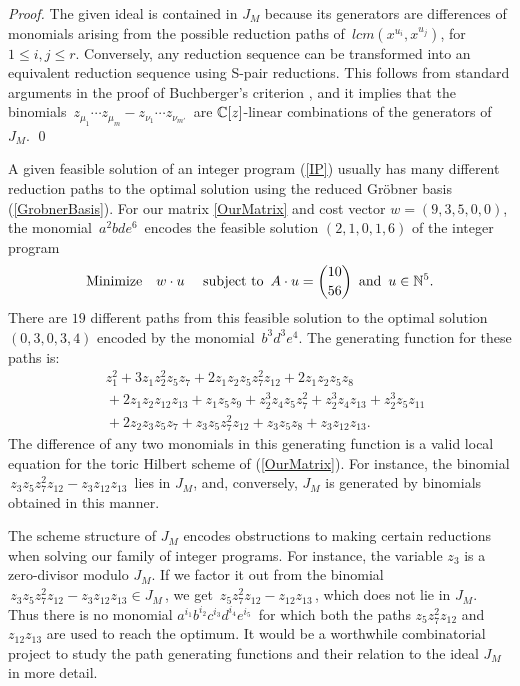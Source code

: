 \begin{proof}
The given ideal is contained in $J_M$ because its generators
are differences of monomials arising from the possible
reduction paths of $\,{lcm(x^{u_i},x^{u_j})} $,
for $1 \leq i,j \leq r $. Conversely, any reduction
sequence can be transformed into an equivalent reduction sequence
using S-pair reductions. This follows from standard
arguments in the proof of Buchberger's criterion
\cite[\S 2.6, Theorem 6]{HS:CLO}, and it implies that
the binomials  $ \, z_{\mu_1}  \cdots z_{\mu_m} -
 z_{\nu_1}  \cdots z_{\nu_{m'}}  \,$ are $\mathbb{C}[z]$-linear
combinations of the generators of $J_M$.
\qed
\end{proof}

A given feasible solution of an integer program (\ref{IP})
usually has many different reduction paths to the optimal solution
using  the reduced Gr\"obner basis (\ref{GrobnerBasis}). 
For our matrix \ref{OurMatrix} and cost vector 
$w = (9,3,5,0,0)$, the monomial
$\, a^2 b d e^6 \,$  encodes the feasible solution $(2,1,0,1,6)$
of the integer program 
$$ {\rm Minimize} \quad
w \cdot u \,\,\quad
{\rm subject} \,\, {\rm to } \,\,\,
A \cdot u = \binom{10}{56}   \,\,\, {\rm and}
 \,\,\,u \in \mathbb{N}^5.$$
There are $19$ different paths from this feasible solution 
to the optimal solution $(0,3,0,3,4)$ encoded by the monomial 
$\, b^3 d^3 e^4 $. The generating function for these paths is:
\begin{eqnarray*}
& z_1^2 + 3 z_1 z_2^2 z_5 z_7 + 2 z_1 z_2 z_5 z_7^2 z_{12}
 + 2 z_1 z_2 z_5 z_8 \\ & {} + 2 z_1 z_2 z_{12} z_{13} + z_1 z_5 z_9 
 + z_2^3 z_4 z_5 z_7^2 + z_2^3 z_4 z_{13} + z_2^3 z_5 z_{11} \\ & {} 
 + 2 z_2 z_3 z_5 z_7 + z_3 z_5 z_7^2 z_{12} + z_3 z_5 z_8 + z_3 z_{12} z_{13}.
\end{eqnarray*}
The difference of any two monomials in this generating function 
is a valid local equation for the toric Hilbert scheme of
(\ref{OurMatrix}). For instance, the binomial 
$\,  z_3 z_5 z_7^2 z_{12} - z_3 z_{12} z_{13} \,$ lies in $J_M$,
and, conversely, $J_M$ is generated by binomials obtained in this manner.

The scheme structure of $J_M$ encodes obstructions to making certain
reductions when solving our family of integer programs. For instance,
the variable $z_3$ is a zero-divisor modulo $J_M$. If we factor it
out from the binomial $\,  z_3 z_5 z_7^2 z_{12} - z_3 z_{12} z_{13}
\in J_M \,$, we get 
$\, z_5 z_7^2 z_{12} - z_{12} z_{13} \,$,
which does not lie in $J_M$. Thus there is no monomial
$a^{i_1} b^{i_2} c^{i_3} d^{i_4} e^{i_5} \,$
for which both the paths $ z_5 z_7^2 z_{12} $ and
$ z_{12} z_{13} $ are used to reach the optimum.
It would be a worthwhile combinatorial project to
study the path generating functions and their relation
to the ideal $J_M$ in more detail.

